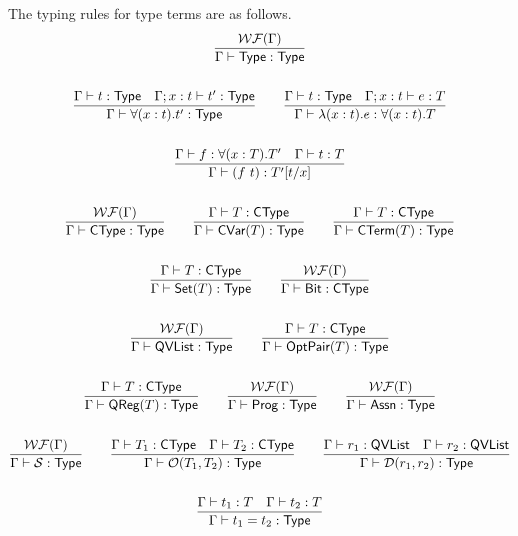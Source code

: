 The typing rules for type terms are as follows.
\begin{gather*}
    \frac{\mathcal{WF}(\Gamma)}{\Gamma \vdash \textsf{Type} : \textsf{Type}} \\
    \\
    \frac{\Gamma \vdash t : \textsf{Type} \quad \Gamma; x:t \vdash t' : \textsf{Type}}{\Gamma \vdash \forall (x:t). t' : \textsf{Type}}
    \qquad
    \frac{\Gamma \vdash t : \textsf{Type} \quad \Gamma; x:t \vdash e : T}{\Gamma \vdash \lambda (x:t). e : \forall (x:t). T} \\
    \\
    \frac{\Gamma \vdash f : \forall (x : T). T' \quad \Gamma \vdash t : T}{\Gamma \vdash (f\ t) : T'[t/x]}\\
    \\
    \frac{\mathcal{WF}(\Gamma)}{\Gamma \vdash \textsf{CType} : \textsf{Type}}
    \qquad
    \frac{\Gamma \vdash T : \textsf{CType}}{\Gamma \vdash \textsf{CVar}(T) : \textsf{Type}}
    \qquad
    \frac{\Gamma \vdash T : \textsf{CType}}{\Gamma \vdash \textsf{CTerm}(T) : \textsf{Type} }
    \\
    \\
    \frac{\Gamma \vdash T : \textsf{CType}}{\Gamma \vdash \textsf{Set}(T) : \textsf{Type}}
    \qquad
    \frac{\mathcal{WF}(\Gamma)}{\Gamma \vdash \textsf{Bit} : \textsf{CType}}
    \\
    \\
    \frac{\mathcal{WF}(\Gamma)}{\Gamma \vdash \textsf{QVList} : \textsf{Type}}
    \qquad
    \frac{\Gamma \vdash T : \textsf{CType}}{\Gamma \vdash \textsf{OptPair}(T) : \textsf{Type}}\\
    \\
    \frac{\Gamma \vdash T : \textsf{CType}}{\Gamma \vdash \textsf{QReg}(T) : \textsf{Type}}
    \qquad
    \frac{\mathcal{WF}(\Gamma)}{\Gamma \vdash \textsf{Prog} : \textsf{Type}} 
    \qquad
    \frac{\mathcal{WF}(\Gamma)}{\Gamma \vdash \textsf{Assn} : \textsf{Type}}
    \\
    \\
    \frac{\mathcal{WF}(\Gamma)}{\Gamma \vdash \mathcal{S} : \textsf{Type}}
    \qquad
    \frac{\Gamma \vdash T_1 : \textsf{CType} \quad \Gamma \vdash T_2 : \textsf{CType}}{\Gamma \vdash \mathcal{O}(T_1, T_2) : \textsf{Type}}
    \qquad
    \frac{\Gamma \vdash r_1 : \textsf{QVList} \quad \Gamma \vdash r_2 : \textsf{QVList}}{\Gamma \vdash \mathcal{D}(r_1, r_2) : \textsf{Type}} 
    \\
    \\
    \frac{\Gamma \vdash t_1 : T \quad \Gamma \vdash t_2 : T}{\Gamma \vdash t_1 = t_2 : \textsf{Type}}
\end{gather*}

